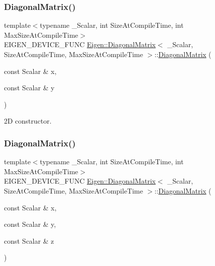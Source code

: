 \subsubsection{\texorpdfstring{DiagonalMatrix()}{DiagonalMatrix()}\hspace{0.1cm}{\footnotesize\ttfamily [3/7]}}
{\footnotesize\ttfamily template$<$typename \+\_\+\+Scalar, int Size\+At\+Compile\+Time, int Max\+Size\+At\+Compile\+Time$>$ \\
E\+I\+G\+E\+N\+\_\+\+D\+E\+V\+I\+C\+E\+\_\+\+F\+U\+NC \mbox{\hyperlink{class_eigen_1_1_diagonal_matrix}{Eigen\+::\+Diagonal\+Matrix}}$<$ \+\_\+\+Scalar, Size\+At\+Compile\+Time, Max\+Size\+At\+Compile\+Time $>$\+::\mbox{\hyperlink{class_eigen_1_1_diagonal_matrix}{Diagonal\+Matrix}} (\begin{DoxyParamCaption}\item[{const Scalar \&}]{x,  }\item[{const Scalar \&}]{y }\end{DoxyParamCaption})\hspace{0.3cm}{\ttfamily [inline]}}

2D constructor. \mbox{\label{class_eigen_1_1_diagonal_matrix_aebf160f0165e6602249cbe03148f6c04}} 
\subsubsection{\texorpdfstring{DiagonalMatrix()}{DiagonalMatrix()}\hspace{0.1cm}{\footnotesize\ttfamily [4/7]}}
{\footnotesize\ttfamily template$<$typename \+\_\+\+Scalar, int Size\+At\+Compile\+Time, int Max\+Size\+At\+Compile\+Time$>$ \\
E\+I\+G\+E\+N\+\_\+\+D\+E\+V\+I\+C\+E\+\_\+\+F\+U\+NC \mbox{\hyperlink{class_eigen_1_1_diagonal_matrix}{Eigen\+::\+Diagonal\+Matrix}}$<$ \+\_\+\+Scalar, Size\+At\+Compile\+Time, Max\+Size\+At\+Compile\+Time $>$\+::\mbox{\hyperlink{class_eigen_1_1_diagonal_matrix}{Diagonal\+Matrix}} (\begin{DoxyParamCaption}\item[{const Scalar \&}]{x,  }\item[{const Scalar \&}]{y,  }\item[{const Scalar \&}]{z }\end{DoxyParamCaption})\hspace{0.3cm}{\ttfamily [inline]}}

